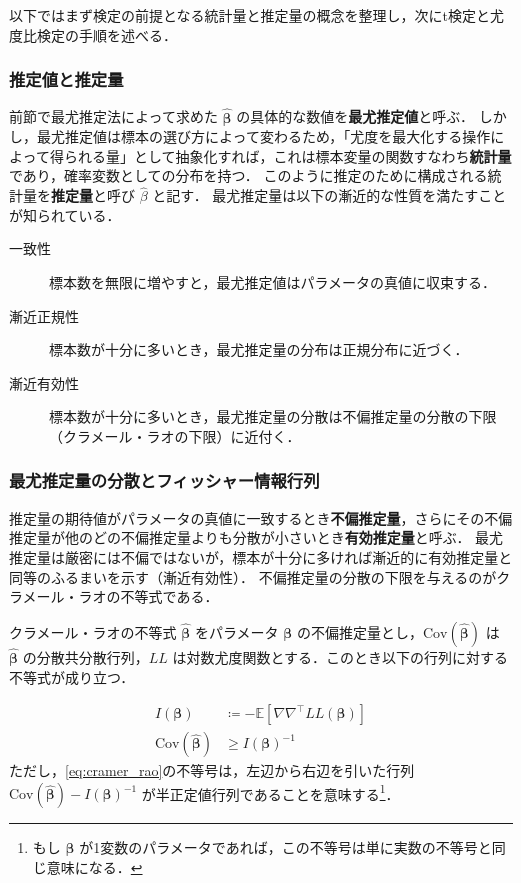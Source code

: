 以下ではまず検定の前提となる統計量と推定量の概念を整理し，次にt検定と尤度比検定の手順を述べる．

\subsubsection{推定値と推定量}\label{ssec:estimator}
前節で最尤推定法によって求めた $\hat{\bm\beta}$ の具体的な数値を\textbf{最尤推定値}と呼ぶ．
しかし，最尤推定値は標本の選び方によって変わるため，「尤度を最大化する操作によって得られる量」として抽象化すれば，これは標本変量の関数すなわち\textbf{統計量}であり，確率変数としての分布を持つ．
このように推定のために構成される統計量を\textbf{推定量}と呼び $\hat\beta$ と記す．
最尤推定量は以下の漸近的な性質を満たすことが知られている．
\begin{description}
    \item[一致性] 標本数を無限に増やすと，最尤推定値はパラメータの真値に収束する．
    \item[漸近正規性] 標本数が十分に多いとき，最尤推定量の分布は正規分布に近づく．
    \item[漸近有効性] 標本数が十分に多いとき，最尤推定量の分散は不偏推定量の分散の下限（クラメール・ラオの下限）に近付く．
\end{description}

\subsubsection{最尤推定量の分散とフィッシャー情報行列}\label{ssec:variance_estimator}
推定量の期待値がパラメータの真値に一致するとき\textbf{不偏推定量}，さらにその不偏推定量が他のどの不偏推定量よりも分散が小さいとき\textbf{有効推定量}と呼ぶ．
最尤推定量は厳密には不偏ではないが，標本が十分に多ければ漸近的に有効推定量と同等のふるまいを示す（漸近有効性）．
不偏推定量の分散の下限を与えるのがクラメール・ラオの不等式である．

\begin{itembox}[l]{クラメール・ラオの不等式}
    \label{it:cramer_rao}
    $\bm{\hat\beta}$ をパラメータ $\bm\beta$ の不偏推定量とし，$\mathrm{Cov}(\bm{\hat\beta})$ は $\bm{\hat\beta}$ の分散共分散行列，$LL$ は対数尤度関数とする．このとき以下の行列に対する不等式が成り立つ．

    \begin{align}
        \label{eq:fisher_information}
        I(\bm\beta) &\coloneqq -\mathbb{E}\left[\nabla\nabla^\top LL(\bm\beta)\right] \\
        \label{eq:cramer_rao}
        \mathrm{Cov}(\bm{\hat\beta}) &\ge I(\bm\beta)^{-1}
    \end{align}
    ただし，\eqref{eq:cramer_rao}の不等号は，左辺から右辺を引いた行列 $\mathrm{Cov}(\bm{\hat\beta})-I(\bm\beta)^{-1}$ が半正定値行列であることを意味する\footnote{もし $\bm\beta$ が1変数のパラメータであれば，この不等号は単に実数の不等号と同じ意味になる．}．
\end{itembox}

